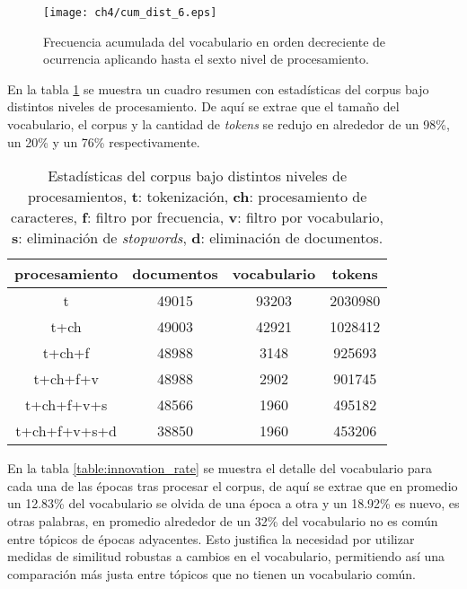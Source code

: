 \begin{figure}
    \centering
    \texttt{[image: ch4/cum\_dist\_6.eps]}
    \caption{Frecuencia acumulada del vocabulario en orden decreciente de ocurrencia aplicando hasta el sexto nivel de procesamiento.}
    \label{img:cum_dist6}
\end{figure}

En la tabla \ref{table:processing_stats} se muestra un cuadro resumen con estadísticas del corpus bajo distintos niveles de procesamiento. De aquí se extrae que el tamaño del vocabulario, el corpus y la cantidad de \textit{tokens} se redujo en alrededor de un 98\%, un 20\% y un 76\% respectivamente.

\begin{table}[H]
    \begin{tabular}{|c|c|c|c|}
    \hline
    procesamiento & documentos & vocabulario & tokens  \\ \hline
    t             & 49015      & 93203       & 2030980 \\ \hline
    t+ch          & 49003      & 42921       & 1028412 \\ \hline
    t+ch+f        & 48988      & 3148        & 925693  \\ \hline
    t+ch+f+v      & 48988      & 2902        & 901745  \\ \hline
    t+ch+f+v+s    & 48566      & 1960        & 495182  \\ \hline
    t+ch+f+v+s+d  & 38850      & 1960        & 453206  \\ \hline
    \end{tabular}
    \caption{Estadísticas del corpus bajo distintos niveles de procesamientos, \textbf{t}: tokenización, \textbf{ch}: procesamiento de caracteres, \textbf{f}: filtro por frecuencia, \textbf{v}: filtro por vocabulario, \textbf{s}: eliminación de \textit{stopwords}, \textbf{d}: eliminación de documentos.}
    \label{table:processing_stats}
    \end{table}

En la tabla \ref{table:innovation_rate} se muestra el detalle del vocabulario para cada una de las épocas tras procesar el corpus, de aquí se extrae que en promedio un 12.83\% del vocabulario se olvida de una época a otra y un 18.92\% es nuevo, es otras palabras, en promedio alrededor de un 32\% del vocabulario no es común entre tópicos de épocas adyacentes. Esto justifica la necesidad por utilizar medidas de similitud robustas a cambios en el vocabulario, permitiendo así una comparación más justa entre tópicos que no tienen un vocabulario común.


